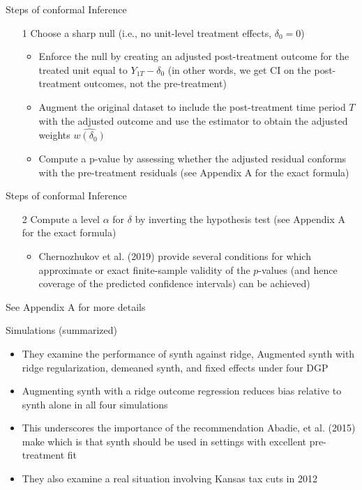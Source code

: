 \documentclass{beamer}
\begin{document}
\begin{frame}{Steps of conformal Inference}

\begin{enumerate}
\item [1] Choose a sharp null (i.e., no unit-level treatment effects, $\delta_0=0$)
	\begin{itemize}
	\item Enforce the null by creating an adjusted post-treatment outcome for the treated unit equal to $Y_{1T}-\delta_0$ (in other words, we get CI on the post-treatment outcomes, not the pre-treatment)
	\item Augment the original dataset to include the post-treatment time period $T$ with the adjusted outcome and use the estimator to obtain the adjusted weights $\widehat{w(\delta_0)}$
	\item Compute a p-value by assessing whether the adjusted residual conforms with the pre-treatment residuals (see Appendix A for the exact formula)
	\end{itemize}
\end{enumerate}


\end{frame}


\begin{frame}{Steps of conformal Inference}

\begin{enumerate}
\item [2] Compute a level $\alpha$ for $\delta$ by inverting the hypothesis test (see Appendix A for the exact formula)
	\begin{itemize}
	\item Chernozhukov et al. (2019) provide several conditions for which approximate or exact finite-sample validity of the $p$-values (and hence coverage of the predicted confidence intervals) can be achieved)
	\end{itemize}
\end{enumerate}

See Appendix A for more details

\end{frame}


\begin{frame}{Simulations (summarized)}

\begin{itemize}
\item They examine the performance of synth against ridge, Augmented synth with ridge regularization, demeaned synth, and fixed effects under four DGP
\item Augmenting synth with a ridge outcome regression reduces bias relative to synth alone in all four simulations
\item This underscores the importance of the recommendation Abadie, et al. (2015) make which is that synth should be used in settings with excellent pre-treatment fit
\item They also examine a real situation involving Kansas tax cuts in 2012
\end{itemize}

\end{frame}
\end{document}
